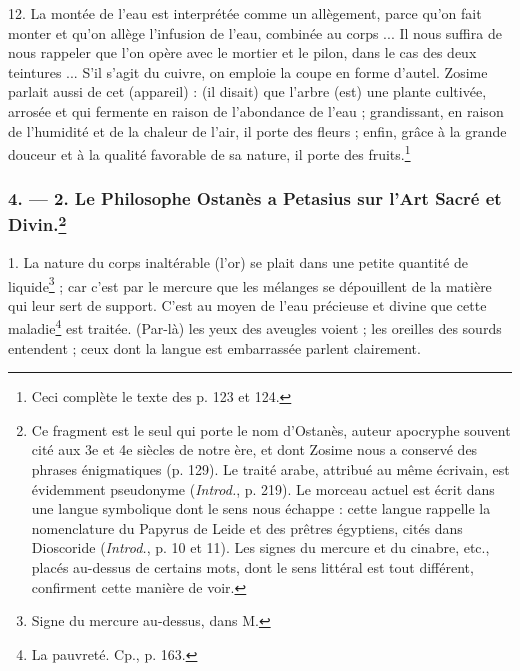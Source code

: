 \documentclass[a4paper, 11pt, oneside, polutonikogreek, french]{article}
\begin{document}
12. La montée de l'eau est interprétée comme un allègement, parce qu'on fait monter et qu'on allège l'infusion de l'eau, combinée au corps ... Il nous suffira de nous rappeler que l'on opère avec le mortier et le pilon, dans le cas des deux teintures ... S'il s'agit du cuivre, on emploie la coupe en forme d'autel. Zosime parlait aussi de cet (appareil) : (il disait) que l'arbre (est) une plante cultivée, arrosée et qui fermente en raison de l'abondance de l'eau ; grandissant, en raison de l'humidité et de la chaleur de l'air, il porte des fleurs ; enfin, grâce à la grande douceur et à la qualité favorable de sa nature, il porte des fruits.\footnote{Ceci complète le texte des p. 123 et 124.}

\bigskip
\centerline{\EightStarTaper}
\centerline{\EightStarTaper\EightStarTaper}
\bigskip

\subsubsection[4. --- 2. Le Philosophe Ostanès a Petasius sur l'Art Sacré et Divin.]{4. --- 2. Le Philosophe Ostanès a Petasius sur l'Art Sacré et Divin.\footnote{Ce fragment est le seul qui porte le nom d'Ostanès, auteur apocryphe souvent cité aux 3e et 4e siècles de notre ère, et dont Zosime nous a conservé des phrases énigmatiques (p. 129). Le traité arabe, attribué au même écrivain, est évidemment pseudonyme (\emph{Introd.}, p. 219). Le morceau actuel est écrit dans une langue symbolique dont le sens nous échappe : cette langue rappelle la nomenclature du Papyrus de Leide et des prêtres égyptiens, cités dans Dioscoride (\emph{Introd.}, p. 10 et 11). Les signes du mercure et du cinabre, etc., placés au-dessus de certains mots, dont le sens littéral est tout différent, confirment cette manière de voir.}}

1. La nature du corps inaltérable (l'or) se plait dans une petite quantité de liquide\footnote{Signe du mercure au-dessus, dans M.} ; car c'est par le mercure que les mélanges se dépouillent de la matière qui leur sert de support. C'est au moyen de l'eau précieuse et divine que cette maladie\footnote{La pauvreté. Cp., p. 163.} est traitée. (Par-là) les yeux des aveugles voient ; les oreilles des sourds entendent ; ceux dont la langue est embarrassée parlent clairement.
\end{document}
